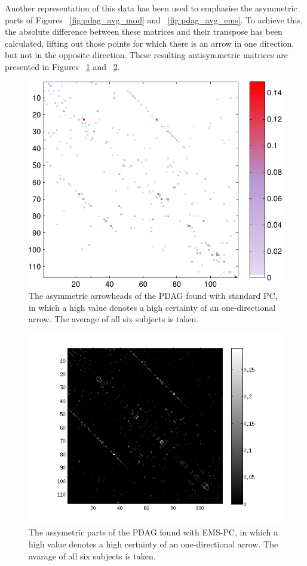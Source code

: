 \documentclass[a4paper, 10pt, english, onecolumn]{article}
\begin{document}
Another representation of this data has been used to emphasise the asymmetric parts of Figures ~\ref{fig:pdag_avg_mod} and ~\ref{fig:pdag_avg_ems}.
To achieve this, the absolute difference between these matrices and their transpose has been calculated, lifting out those points for which there is an arrow in one direction, but not in the opposite direction.
These resulting antisymmetric matrices are presented in Figures ~\ref{fig:pdag_avg_antisymmetric_mod} and ~\ref{fig:pdag_avg_antisymmetric_ems}.

\begin{figure}[h!]
  \centering
  \includegraphics{images/arrowheads_avg_mod}
  \caption{The asymmetric arrowheads of the PDAG found with standard PC, in which a high value denotes a high certainty of an one-directional arrow. The average of all six subjects is taken.}
  \label{fig:pdag_avg_antisymmetric_mod}
\end{figure}

\begin{figure}[h!]
  \centering
  \includegraphics{images/PDAG_avg_antisymmetric_expl}
  \caption{The assymetric parts of the PDAG found with EMS-PC, in which a high value denotes a high certainty of an one-directional arrow. The avarage of all six subjects is taken.}
  \label{fig:pdag_avg_antisymmetric_ems}
\end{figure}
\end{document}
